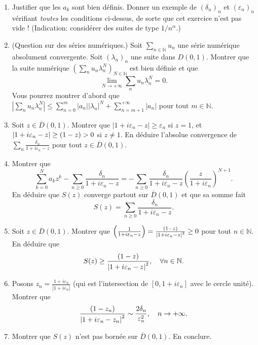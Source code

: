 \documentclass[a4paper,10pt]{article}
\newcommand{\N}{\mathbb{N}}
\newcommand{\abs}[1]{\left|#1\right|}
\let\Re\relax
\DeclareMathOperator{\Re}{Re} %
\begin{document}
\begin{enumerate}[label=\alph*)]
    \item Justifier que les $a_k$ sont bien définis. Donner un exemple de $(\delta_n)_n$ et $(\varepsilon_n)_n$ vérifiant \emph{toutes} les conditions ci-dessus, de sorte que cet exercice n'est pas vide ! (Indication: considérer des suites de type $1/n^\alpha$.)
    \item (Question sur des séries numériques.) Soit $\sum_{n\in\N} u_n$ une série numérique absolument convergente. Soit $(\lambda_n)_n$ une suite dans $D(0,1)$. Montrer que la suite numérique $(\sum_n u_n\lambda_n^N)_{N\in\N}$ est bien définie et que
    $$\lim_{N\to+\infty}\sum_{n}u_n\lambda_n^N=0.$$
    Vous pourrez montrer d'abord que $\abs{\sum_n u_n\lambda_n^N}\leq\sum_{n=0}^m\abs{a_n}\abs{\lambda_n}^N+\sum_{n=m+1}^{+\infty}\abs{a_n}$ pour tout $m\in\N$.
    \item Soit $z\in\overline{D}(0,1)$. Montrer que $\abs{1+i\varepsilon_n-z}\geq \varepsilon_n$ si $z=1$, et $\abs{1+i\varepsilon_n-z}\geq\Re(1-z)>0$ si $z\neq 1$.
    En déduire l'absolue convergence de $\sum_n\frac{\delta_n}{1+i\varepsilon_n-z}$ pour tout $z\in\overline{D}(0,1)$.
    \item Montrer que 
    $$\sum_{k=0}^Na_kz^k-\sum_{n\geq0}\frac{\delta_n}{1+i\varepsilon_n-z}=-\sum_{n\geq0}\frac{\delta_n}{1+i\varepsilon_n-z}\left(\frac{z}{1+i\varepsilon_n}\right)^{N+1}.$$
    En déduire que $S(z)$ converge partout sur $\overline{D}(0,1)$ et que sa somme fait
    $$S(z)=\sum_{n\geq 0}\frac{\delta_n}{1+i\varepsilon_n-z}.$$
    \item Soit $z\in\overline{D}(0,1)$. Montrer que $\Re\left(\frac{1}{1+i\varepsilon_n-z}\right)=\frac{\Re(1-z)}{\abs{1+i\varepsilon_n-z}^2}\geq0$ pour tout $n\in\N$.
    En déduire que
    $$\Re S(z)\geq \frac{\Re(1-z)}{\abs{1+i\varepsilon_n-z}^2},\quad \forall n\in\N.$$
    \item Posons $z_n=\frac{1+i\varepsilon_n}{\abs{1+i\varepsilon_n}}$ (qui est l'intersection de $[0,1+i\varepsilon_n]$ avec le cercle unité). Montrer que
    $$\frac{\Re(1-z_n)}{\abs{1+i\varepsilon_n-z_n}^2}\sim\frac{2\delta_n}{\varepsilon_n^2},\quad n\to+\infty.$$
    \item Montrer que $S(z)$ n'est pas bornée sur $\overline{D}(0,1)$. En conclure.
\end{enumerate}
    
    
\end{document}
